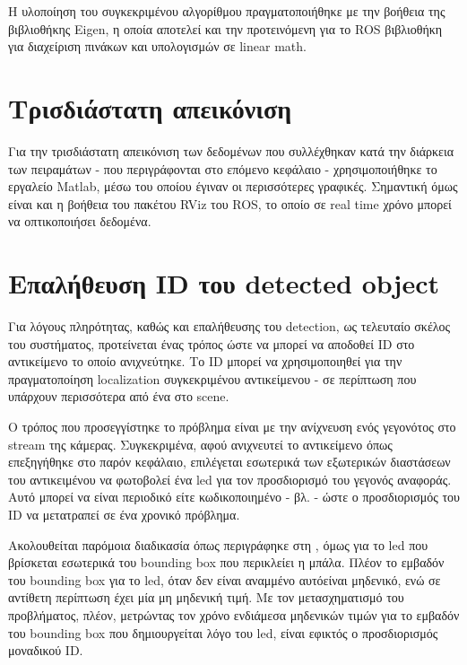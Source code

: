 Η υλοποίηση του συγκεκριμένου αλγορίθμου πραγματοποιήθηκε με την βοήθεια της βιβλιοθήκης Eigen, η οποία αποτελεί και την προτεινόμενη για το ROS βιβλιοθήκη για διαχείριση πινάκων και υπολογισμών σε linear math. 



\section{Τρισδιάστατη απεικόνιση}
Για την τρισδιάστατη απεικόνιση των δεδομένων που συλλέχθηκαν κατά την διάρκεια των πειραμάτων - που περιγράφονται στο επόμενο κεφάλαιο - χρησιμοποιήθηκε το εργαλείο Matlab, μέσω του οποίου έγιναν οι περισσότερες γραφικές. Σημαντική όμως είναι και η βοήθεια του πακέτου RViz του ROS, το οποίο σε real time χρόνο μπορεί να οπτικοποιήσει δεδομένα.


\section{Επαλήθευση ID του detected object}\label{sec:id-estimation}
Για λόγους πληρότητας, καθώς και επαλήθευσης του detection, ως τελευταίο σκέλος του συστήματος, προτείνεται ένας τρόπος ώστε να μπορεί να αποδοθεί ID στο αντικείμενο το οποίο ανιχνεύτηκε. Το ID μπορεί να χρησιμοποιηθεί για την πραγματοποίηση localization συγκεκριμένου αντικείμενου - σε περίπτωση που υπάρχουν περισσότερα από ένα στο scene. 

Ο τρόπος που προσεγγίστηκε το πρόβλημα είναι με την ανίχνευση ενός γεγονότος στο stream της κάμερας. Συγκεκριμένα, αφού ανιχνευτεί το αντικείμενο όπως επεξηγήθηκε στο παρόν κεφάλαιο, επιλέγεται εσωτερικά των εξωτερικών διαστάσεων του αντικειμένου να φωτοβολεί ένα led για τον προσδιορισμό του γεγονός αναφοράς. Αυτό μπορεί να είναι περιοδικό είτε κωδικοποιημένο - βλ.  - ώστε ο προσδιορισμός του ID να μετατραπεί σε ένα χρονικό πρόβλημα.

Ακολουθείται παρόμοια διαδικασία όπως περιγράφηκε στη , όμως για το led που βρίσκεται εσωτερικά του bounding box που περικλείει η μπάλα. Πλέον το εμβαδόν του bounding box για το led, όταν δεν είναι αναμμένο αυτό\udot είναι μηδενικό, ενώ σε αντίθετη περίπτωση έχει μία μη μηδενική τιμή. Με τον μετασχηματισμό του προβλήματος, πλέον, μετρώντας τον χρόνο ενδιάμεσα μηδενικών τιμών για το εμβαδόν του bounding box που δημιουργείται λόγο του led, είναι εφικτός ο προσδιορισμός μοναδικού ID.

